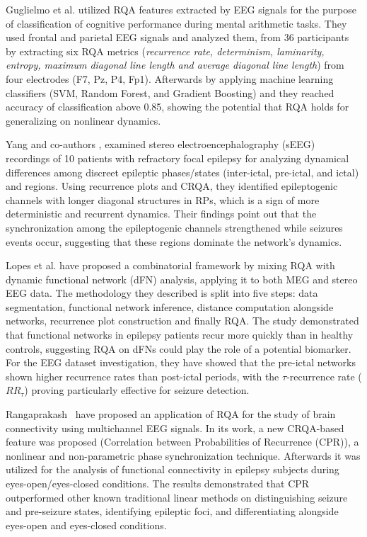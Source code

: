 \documentclass{article}
\begin{document}
			Guglielmo et al. \cite{guglielmo}  
			utilized RQA features extracted 
			by EEG signals for the purpose of classification
			of cognitive performance during mental arithmetic tasks. 
			They used frontal and parietal EEG signals 
			and analyzed them, from 36 participants by extracting 
			six RQA metrics (\textit{recurrence rate, determinism, 
			laminarity, entropy, maximum diagonal line length and average diagonal line length}) 
			from four electrodes (F7, Pz, P4, Fp1). 
			Afterwards by applying machine learning classifiers 
			(SVM, Random Forest, and Gradient Boosting) and
			they reached accuracy of classification above 0.85, 
			showing the potential that RQA holds for 
			generalizing on nonlinear dynamics.
			
			Yang and co-authors \cite{yang2019dynamical}, examined stereo electroencephalography (sEEG) 
			recordings of 10 patients with refractory focal epilepsy for analyzing dynamical differences 
			among discreet epileptic phases/states (inter-ictal, pre-ictal, and ictal) and regions. 
			Using recurrence plots and CRQA, they identified epileptogenic channels with longer diagonal
			structures in RPs, which is a sign of more deterministic and recurrent dynamics. 
			Their findings point out that the synchronization among the epileptogenic channels strengthened 
			while seizures events occur, suggesting that these regions dominate the 
			network's dynamics.


			Lopes et al. \cite{lopes} have proposed a 
			combinatorial framework 
			by mixing RQA with dynamic functional network (dFN) analysis,
			applying it to both MEG and stereo EEG data. 
			The methodology they described is split 
			into five steps: data segmentation, 
			functional network inference, distance computation alongside networks, 
			recurrence plot construction and finally RQA. 
			The study demonstrated that functional networks in epilepsy 
			patients recur more quickly than in healthy controls, suggesting RQA on
			dFNs could play the role of a potential biomarker.
			For the EEG dataset investigation, they have showed that the pre-ictal 
			networks shown higher recurrence rates 
			than post-ictal periods, with the $\tau$-recurrence rate ($RR_{\tau}$) proving particularly 
			effective for seizure detection.
			
			Rangaprakash~\cite{rangaprakash2014} have proposed an application of RQA for the study of
			brain connectivity using multichannel EEG signals. In its work,
			a new CRQA-based feature was proposed (Correlation between 
			Probabilities of Recurrence (CPR)), a nonlinear and non-parametric 
			phase synchronization technique. Afterwards it was utilized for the analysis 
			of functional connectivity in epilepsy subjects during eyes-open/eyes-closed conditions.
			The results demonstrated that CPR outperformed other known traditional 
			linear methods on distinguishing seizure and pre-seizure states, 
			identifying epileptic foci, and differentiating alongside eyes-open and eyes-closed conditions. 
\end{document}
